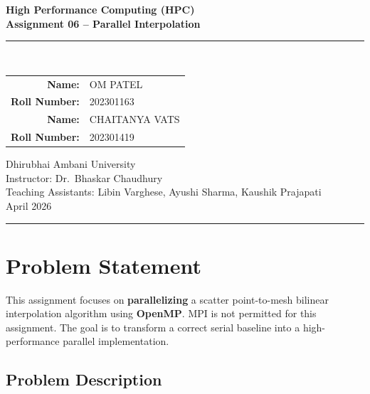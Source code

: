 \documentclass[12pt,a4paper]{article}
\begin{document}
\begin{titlepage}
\centering
\vspace*{2cm}

{\LARGE\bfseries High Performance Computing (HPC)\\[0.3cm]}
{\Large\bfseries Assignment 06 -- Parallel Interpolation\\[1.5cm]}

\rule{\textwidth}{1pt}\\[1cm]

{\large
\begin{tabular}{rl}
\textbf{Name:} & OM PATEL \\
\textbf{Roll Number:} & 202301163 \\[0.5cm]
\textbf{Name:} & CHAITANYA VATS \\
\textbf{Roll Number:} & 202301419 \\
\end{tabular}
}

\vspace{1.5cm}

{\large Dhirubhai Ambani University \\[0.3cm]}
{\large Instructor: Dr.\ Bhaskar Chaudhury \\[0.3cm]}
{\large Teaching Assistants: Libin Varghese, Ayushi Sharma, Kaushik Prajapati \\[0.5cm]}
{\large April 2026}

\vfill
\rule{\textwidth}{1pt}
\end{titlepage}

\tableofcontents
\newpage

\section{Problem Statement}

This assignment focuses on \textbf{parallelizing} a scatter point-to-mesh bilinear interpolation algorithm using \textbf{OpenMP}. MPI is not permitted for this assignment. The goal is to transform a correct serial baseline into a high-performance parallel implementation.

\subsection{Problem Description}
\end{document}
